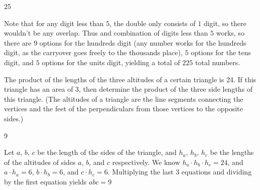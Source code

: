 \documentclass[11pt]{article}
\begin{document}
\begin{answer}
25
\end{answer}

\begin{solution}
Note that for any digit less than $5$, the double only consists of $1$ digit, so there wouldn't be any overlap. Thus and combination of digits less than $5$ works, so there are $9$ options for the hundreds digit (any number works for the hundreds digit, as the carryover goes freely to the thousands place), $5$ options for the tens digit, and $5$ options for the units digit, yielding a total of $\boxed{225}$ total numbers. 
\end{solution}


\begin{problem}
The product of the lengths of the three altitudes of a certain triangle is 24. If this triangle has an area of 3, then determine the product of the three side lengths of this triangle.  (The altitudes of a triangle are the line segments connecting the vertices and the feet of the perpendiculars from those vertices to the opposite sides.) %
\end{problem}

\begin{answer}
9
\end{answer}

\begin{solution}
Let $a$, $b$, $c$ be the length of the sides of the triangle, and $h_a$, $h_b$, $h_c$ be the lengths of the altitudes of 
sides $a$, $b$, and $c$ respectively. We know $h_a \cdot h_b \cdot h_c = 24$, and $a \cdot h_a = 6$, $b \cdot h_b = 6$, 
and $c \cdot h_c = 6$. Multiplying the last 3 equations and dividing by the first equation yields $abc = \boxed{9}$
\end{solution}
\end{document}
